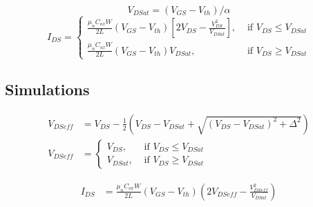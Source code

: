 \documentclass{article}
\begin{document}
\begin{equation}
    V_{DSat} = (V_{GS} - V_{th})/\alpha 
\end{equation}
\begin{equation}
    I_{DS} = \begin{cases}
        \frac{\mu_n C_{ox} W}{2L} (V_{GS}-V_{th}) \left[ 2V_{DS} - \frac{V_{DS}^2}{V_{DSat}}\right], & \text{ if } V_{DS}\leq V_{DSat} \\
        \frac{\mu_n C_{ox} W}{2L} (V_{GS}-V_{th}) V_{DSat}, & \text { if } V_{DS} \geq V_{DSat}
    \end{cases} 
\end{equation}

\subsection{Simulations}

\begin{align}
        V_{DSeff} &= V_{DS} -  \frac{1}{2}(V_{DS}-V_{DSat}+\sqrt{(V_{DS}-V_{DSat})^2 + \Delta^2}) \\
        V_{DSeff} &= \begin{cases}
        V_{DS}, & \text{ if } V_{DS}\leq V_{DSat} \\
        V_{DSat}, & \text { if } V_{DS} \geq V_{DSat}
        \end{cases}
\end{align}

\begin{align} 
    \label{eq:DrainCurrent}
    I_{DS} &= \frac{\mu_n C_{ox} W}{2L}(V_{GS}-V_{th}) \left(2V_{DSeff} - \frac{V_{DSeff}^2}{V_{DSat}}\right)
\end{align}

\newpage
\end{document}
